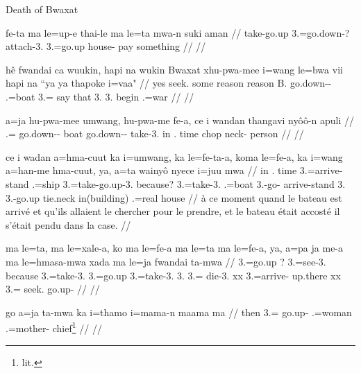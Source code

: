 \xe


Death of Bwaxat

\pex
\a
\begingl
\gla fe-ta ma le=up-e thai-le ma le=ta mwa-n suki aman
// \glb take-go.up  3.=go.down-? attach-3.  3.=go.up house- pay something
// \glft {}
// \endgl

\a
\begingl
\gla hê fwandai ca wuukin, hapi na wukin Bwaxat xhu-pwa-mee i=wang le=bwa vii hapi na ``ya ya thapoke i=vaa"
// \glb yes seek. some reason   reason B. go.down-- .=boat 3.= say that  3. 3. begin .=war
// \glft {}
// \endgl

\a
\begingl
\gla a=ja hu-pwa-mee umwang, hu-pwa-me fe-a, ce i wandan thangavi nyôô-n apuli
// .= go.down-- boat go.down-- take-3. in . time chop neck- person
// \glft {}
// \endgl

\a
\begingl
\gla ce i wadan a=hma-cuut ka i=umwang, ka le=fe-ta-a, koma le=fe-a, ka i=wang a=han-me hma-cuut, ya, a=ta wainyô nyece i=juu mwa
// \glb in . time 3.=arrive-stand  .=ship  3.=take-go.up-3. because? 3.=take-3.  .=boat 3.-go- arrive-stand 3. 3.-go.up tie.neck in(building) .=real house
// \glft à ce moment quand le bateau est arrivé et qu'ils allaient le chercher pour le prendre, et le bateau était accosté il s'était pendu dans la case.
// \endgl

\a
\begingl
\gla ma le=ta, ma le=xale-a, ko ma le=fe-a ma le=ta ma le=fe-a, ya, a=pa ja me-a ma le=hmasa-mwa xada ma le=ja fwandai ta-mwa
// \glb {} 3.=go.up ? 3.=see-3. because  3.=take-3.  3.=go.up  3.=take-3. 3. 3.=  die-3. xx 3.=arrive- up.there xx 3.= seek. go.up-
// \glft  {} 
// \endgl

\a
\begingl
\gla go a=ja ta-mwa ka i=thamo i=mama-n maama ma
// \glb then 3.= go.up-  .=woman .=mother- chief\footnote{lit. } 
// \glft {}
// \endgl

